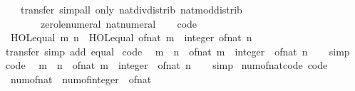 \begin{isabellebody}
\ \ \ \ {\isacharparenleft}transfer{\isacharcomma}\ simp{\isacharunderscore}all\ only{\isacharcolon}\ nat{\isacharunderscore}div{\isacharunderscore}distrib\ nat{\isacharunderscore}mod{\isacharunderscore}distrib\isanewline
\ \ \ \ \ \ \ \ zero{\isacharunderscore}le{\isacharunderscore}numeral\ nat{\isacharunderscore}numeral{\isacharparenright}%
\endisatagproof
{\isafoldproof}%
%
\isadelimproof
\isanewline
%
\endisadelimproof
\ \ \isanewline
{}\isamarkupfalse%
\ {\isacharbrackleft}code{\isacharbrackright}{\isacharcolon}\isanewline
\ \ {\isachardoublequoteopen}HOL{\isachardot}equal\ m\ n\ {\isacharequal}\ HOL{\isachardot}equal\ {\isacharparenleft}of{\isacharunderscore}nat\ m\ {\isacharcolon}{\isacharcolon}\ integer{\isacharparenright}\ {\isacharparenleft}of{\isacharunderscore}nat\ n{\isacharparenright}{\isachardoublequoteclose}\isanewline
%
\isadelimproof
\ \ %
\endisadelimproof
%
\isatagproof
{}\isamarkupfalse%
\ transfer\ {\isacharparenleft}simp\ add{\isacharcolon}\ equal{\isacharparenright}%
\endisatagproof
{\isafoldproof}%
%
\isadelimproof
\isanewline
%
\endisadelimproof
\isanewline
{}\isamarkupfalse%
\ {\isacharbrackleft}code{\isacharbrackright}{\isacharcolon}\isanewline
\ \ {\isachardoublequoteopen}m\ {\isasymle}\ n\ {\isasymlongleftrightarrow}\ {\isacharparenleft}of{\isacharunderscore}nat\ m\ {\isacharcolon}{\isacharcolon}\ integer{\isacharparenright}\ {\isasymle}\ of{\isacharunderscore}nat\ n{\isachardoublequoteclose}\isanewline
%
\isadelimproof
\ \ %
\endisadelimproof
%
\isatagproof
{}\isamarkupfalse%
\ simp%
\endisatagproof
{\isafoldproof}%
%
\isadelimproof
\isanewline
%
\endisadelimproof
\isanewline
{}\isamarkupfalse%
\ {\isacharbrackleft}code{\isacharbrackright}{\isacharcolon}\isanewline
\ \ {\isachardoublequoteopen}m\ {\isacharless}\ n\ {\isasymlongleftrightarrow}\ {\isacharparenleft}of{\isacharunderscore}nat\ m\ {\isacharcolon}{\isacharcolon}\ integer{\isacharparenright}\ {\isacharless}\ of{\isacharunderscore}nat\ n{\isachardoublequoteclose}\isanewline
%
\isadelimproof
\ \ %
\endisadelimproof
%
\isatagproof
{}\isamarkupfalse%
\ simp%
\endisatagproof
{\isafoldproof}%
%
\isadelimproof
\isanewline
%
\endisadelimproof
\isanewline
{}\isamarkupfalse%
\ num{\isacharunderscore}of{\isacharunderscore}nat{\isacharunderscore}code\ {\isacharbrackleft}code{\isacharbrackright}{\isacharcolon}\isanewline
\ \ {\isachardoublequoteopen}num{\isacharunderscore}of{\isacharunderscore}nat\ {\isacharequal}\ num{\isacharunderscore}of{\isacharunderscore}integer\ {\isasymcirc}\ of{\isacharunderscore}nat{\isachardoublequoteclose}\isanewline

\end{isabellebody}
